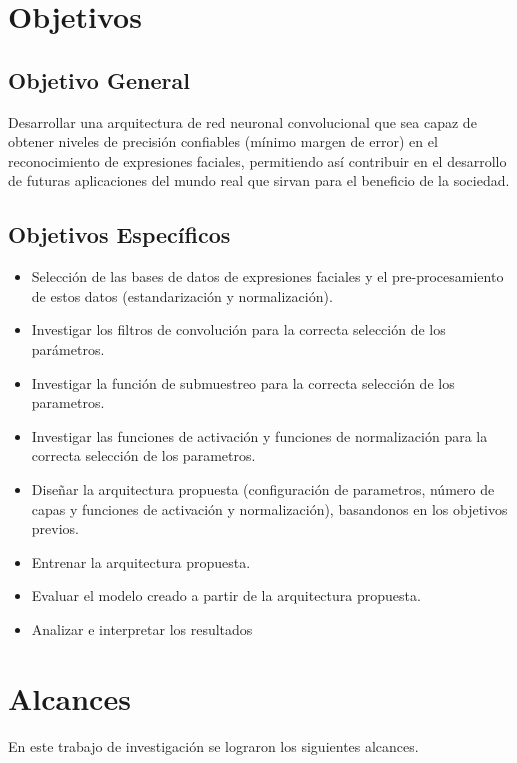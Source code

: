 \section{Objetivos}
\subsection{Objetivo General}
Desarrollar una arquitectura de red neuronal convolucional que sea capaz de obtener niveles de precisión confiables (mínimo margen de error) en el reconocimiento de expresiones faciales, permitiendo así contribuir en el desarrollo de futuras aplicaciones del mundo real que sirvan para el beneficio de la sociedad.
\subsection{Objetivos Específicos}
\begin{itemize}
\item Selección de las bases de datos de expresiones faciales y el pre-procesamiento de estos datos (estandarización y normalización).

\item Investigar los filtros de convolución para la correcta selección de los parámetros.

\item Investigar la función de submuestreo para la correcta selección de los parametros. 

\item Investigar las funciones de activación y funciones de normalización para la correcta selección de los parametros.

\item Diseñar la arquitectura propuesta (configuración de parametros, número de capas y funciones de activación y normalización), basandonos en los objetivos previos.

\item Entrenar la arquitectura propuesta.
	
\item Evaluar el modelo creado a partir de la arquitectura propuesta.

\item Analizar e interpretar los resultados
\end{itemize}

\section{Alcances}
En este trabajo de investigación se lograron los siguientes alcances.

